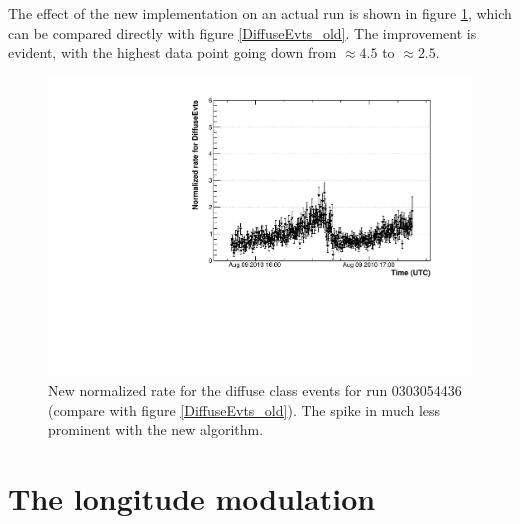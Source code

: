\documentclass[a4paper,twocolumn]{article}
\begin{document}
The effect of the new implementation on an actual run is shown in figure
\ref{DiffuseEvts_new}, which can be compared directly with figure
\ref{DiffuseEvts_old}. The improvement is evident, with the highest data point
going down from $\approx 4.5$ to $\approx 2.5$. 
\begin{figure}[htb!]
  \begin{center}
    \includegraphics[width=\linewidth]{figures/DiffuseEvts_new}
    \caption{New normalized rate for the diffuse class events for run
      0303054436 (compare with figure \ref{DiffuseEvts_old}).
      The spike in much less prominent with the new algorithm.}
    \label{DiffuseEvts_new}
  \end{center}
\end{figure}


\section{The longitude modulation}
\end{document}
